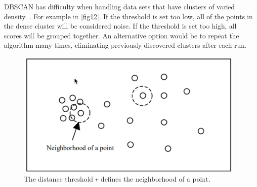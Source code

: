\documentclass[a4paper, 12pt]{article}
\begin{document}



DBSCAN has difficulty when handling data sets that have clusters of varied density.  \citep{ertoz2003finding}. For example in \autoref{fig12}. If the threshold is set too low, all of the points in the dense cluster will be considered noise. If the threshold is set too high, all scores will be grouped together. An alternative option would be to repeat the algorithm many times, eliminating previously discovered clusters after each run.

\begin{figure}[htbp!]
    \centering
    \includegraphics[width=1\textwidth]{DBSCAN disadvantage.png}
    \caption{The distance threshold $r$ defines the neighborhood of a point. \citep{ertoz2003finding}}
    \label{fig12}
\end{figure}
\end{document}
